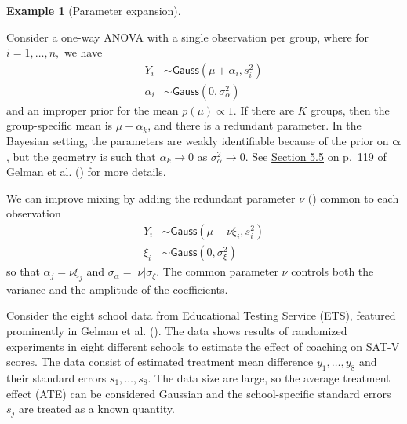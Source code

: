 \documentclass[
  11pt,
  letterpaper,
]{scrbook}
\theoremstyle{definition}
\newtheorem{example}{Example}[chapter]
\theoremstyle{plain}
\theoremstyle{plain}
\theoremstyle{plain}
\theoremstyle{definition}
\theoremstyle{definition}
\theoremstyle{plain}
\theoremstyle{plain}
\theoremstyle{remark}
\begin{document}
\begin{example}[Parameter
expansion]\protect\hypertarget{exm-parameter-expansion}{}\label{exm-parameter-expansion}

Consider a one-way ANOVA with a single observation per group, where for
\(i=1, \ldots, n,\) we have \begin{align*}
Y_{i} &\sim \mathsf{Gauss}(\mu + \alpha_i, s^2_i) \\
\alpha_i &\sim \mathsf{Gauss}(0, \sigma^2_\alpha)
\end{align*} and an improper prior for the mean \(p(\mu) \propto 1.\) If
there are \(K\) groups, then the group-specific mean is
\(\mu+\alpha_k\), and there is a redundant parameter. In the Bayesian
setting, the parameters are weakly identifiable because of the prior on
\(\boldsymbol{\alpha}\), but the geometry is such that
\(\alpha_k \to 0\) as \(\sigma^2_{\alpha} \to 0.\) See
\href{https://users.aalto.fi/~ave/BDA3.pdf}{Section 5.5} on p.~119 of
Gelman et al. () for more details.

We can improve mixing by adding the redundant parameter \(\nu\)
() common to each
observation \begin{align*}
Y_{i} &\sim \mathsf{Gauss}(\mu + \nu\xi_i, s^2_i) \\
\xi_i &\sim \mathsf{Gauss}(0, \sigma^2_\xi)
\end{align*} so that \(\alpha_j = \nu \xi_j\) and
\(\sigma_\alpha = |\nu|\sigma_\xi.\) The common parameter \(\nu\)
controls both the variance and the amplitude of the coefficients.

Consider the eight school data from Educational Testing Service (ETS),
featured prominently in Gelman et al.
(). The data shows results of randomized
experiments in eight different schools to estimate the effect of
coaching on SAT-V scores. The data consist of estimated treatment mean
difference \(y_1, \ldots, y_8\) and their standard errors
\(s_1, \ldots, s_8\). The data size are large, so the average treatment
effect (ATE) can be considered Gaussian and the school-specific standard
errors \(s_j\) are treated as a known quantity.


\end{example}
\end{document}

